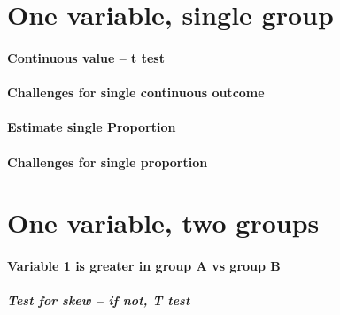 \documentclass[]{book}
\let\oldparagraph\paragraph
\renewcommand{\paragraph}[1]{\oldparagraph{#1}\mbox{}}
\theoremstyle{definition}
\theoremstyle{definition}
\theoremstyle{definition}
\theoremstyle{remark}
\begin{document}
\hypertarget{one-variable-single-group}{%
\chapter{One variable, single group}\label{one-variable-single-group}}

\hypertarget{continuous-value-t-test}{%
\subsubsection{Continuous value -- t
test}\label{continuous-value-t-test}}

\hypertarget{challenges-for-single-continuous-outcome}{%
\subsubsection{Challenges for single continuous
outcome}\label{challenges-for-single-continuous-outcome}}

\hypertarget{estimate-single-proportion}{%
\subsubsection{Estimate single
Proportion}\label{estimate-single-proportion}}

\hypertarget{challenges-for-single-proportion}{%
\subsubsection{Challenges for single
proportion}\label{challenges-for-single-proportion}}

\hypertarget{one-variable-two-groups}{%
\chapter{One variable, two groups}\label{one-variable-two-groups}}

\hypertarget{variable-1-is-greater-in-group-a-vs-group-b}{%
\subsubsection{Variable 1 is greater in group A vs group
B}\label{variable-1-is-greater-in-group-a-vs-group-b}}

\hypertarget{test-for-skew-if-not-t-test}{%
\paragraph{Test for skew -- if not, T
test}\label{test-for-skew-if-not-t-test}}
\end{document}
